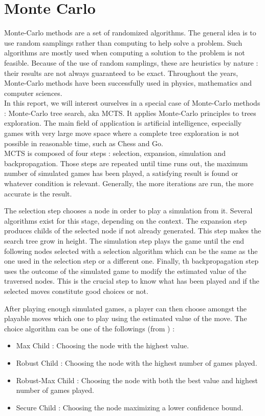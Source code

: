 \section{Monte Carlo}

Monte-Carlo methods are a set of randomized algorithms. The general idea is to use random samplings rather than computing to help solve a problem. Such algorithms are mostly used when computing a solution to the problem is not feasible. Because of the use of random samplings, these are heuristics by nature : their results are not always guaranteed to be exact. Throughout the years, Monte-Carlo methods have been successfully used in physics, mathematics  and computer sciences.\\


In this report, we will interest ourselves in a special case of Monte-Carlo methods : Monte-Carlo tree search, aka MCTS. It applies Monte-Carlo principles to trees exploration. The main field of application is artificial intelligence, especially games with very large move space where a complete tree exploration is not possible in reasonable time, such as Chess and Go.\\

MCTS is composed of four steps : selection, expansion, simulation and backpropagation. Those steps are repeated until time runs out, the maximum number of simulated games has been played, a satisfying result is found or whatever condition is relevant. Generally, the more iterations are run, the more accurate is the result.

The selection step chooses a node in order to play a simulation from it. Several algorithms exist for this stage, depending on the context. The expansion step produces childs of the selected node if not already generated. This step makes the search tree grow in height. The simulation step plays the game until the end following nodes selected with a selection algorithm which can be the same as the one used in the selection step or a different one. Finally, th backpropagation step uses the outcome of the simulated game to modify the estimated value of the traversed nodes. This is the crucial step to know what has been played and if the selected moves constitute good choices or not.

After playing enough simulated games, a player can then choose amongst the playable moves which one to play using the estimated value of the move. The choice algorithm can be one of the followings (from \cite{ChaPHD}) :
\begin{itemize}
\item Max Child : Choosing the node with the highest value.
\item Robust Child : Choosing the node with the highest number of games played.
\item Robust-Max Child : Choosing the node with both the best value and highest number of games played.
\item Secure Child : Choosing the node maximizing a lower confidence bound.\\
\end{itemize}


